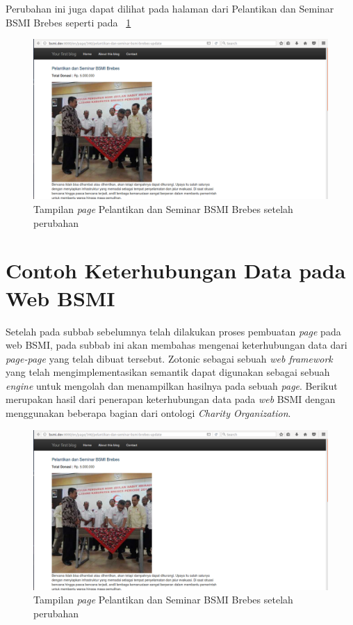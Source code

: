 Perubahan ini juga dapat dilihat pada halaman dari Pelantikan dan Seminar BSMI Brebes seperti pada \pic~\ref{fig:viewprogram5}
\begin{figure}
	\centering
	\includegraphics[width=1\textwidth]
	{pics/29-viewprogramupdatedonation.png}
	\caption{Tampilan \textit{page} Pelantikan dan Seminar BSMI Brebes setelah perubahan}
	\label{fig:viewprogram5}
\end{figure}
\vspace{-0.3cm}

\section{Contoh Keterhubungan Data pada Web BSMI}

Setelah pada subbab sebelumnya telah dilakukan proses pembuatan \textit{page} pada web BSMI, pada subbab ini akan membahas mengenai keterhubungan data dari \textit{page-page} yang telah dibuat tersebut. Zotonic sebagai sebuah \textit{web framework} yang telah mengimplementasikan semantik dapat digunakan sebagai sebuah \textit{engine} untuk mengolah dan menampilkan hasilnya pada sebuah \textit{page}. Berikut merupakan hasil dari penerapan keterhubungan data pada \textit{web} BSMI dengan menggunakan beberapa bagian dari ontologi \textit{Charity Organization}.

\begin{figure}
	\centering
	\includegraphics[width=1\textwidth]
	{pics/29-viewprogramupdatedonation.png}
	\caption{Tampilan \textit{page} Pelantikan dan Seminar BSMI Brebes setelah perubahan}
	\label{fig:bsmibrebes}
\end{figure}
\vspace{-0.3cm}

